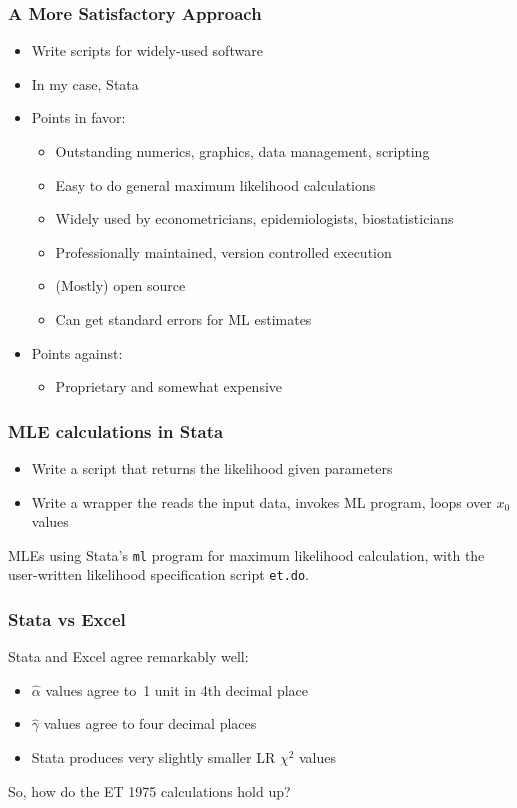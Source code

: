 \begin{frame}
    \frametitle{A More Satisfactory Approach}
	
	\begin{itemize}
		\item Write scripts for widely-used software
		\item In my case, Stata
		\item Points in favor:
		\begin{itemize}
			\item Outstanding numerics, graphics, data management, scripting
			\item Easy to do general maximum likelihood calculations
			\item Widely used by econometricians, epidemiologists, biostatisticians
			\item Professionally maintained, version controlled execution
			\item (Mostly) open source
			\item Can get standard errors for ML estimates
		\end{itemize}
		\item Points against:
		\begin{itemize}
			\item Proprietary and somewhat expensive
		\end{itemize}
	\end{itemize}
\end{frame}


\begin{frame}
	\frametitle{MLE calculations in Stata}
	\begin{itemize}
		\item Write a script that returns the likelihood given parameters
		\item Write a wrapper the reads the input data, invokes ML program, loops over $x_0$ values
	\end{itemize}
	\bigskip
	\begin{table}
		\centering
		
		\caption{MLEs using Stata's \texttt{ml} program for maximum likelihood calculation, with the user-written likelihood specification script \texttt{et.do}.}
	\end{table}
\end{frame}

\begin{frame}
	\frametitle{Stata vs Excel}
	\strut
	\bigskip
	
	Stata and Excel agree remarkably well:
	\begin{itemize}
		\item $\hat\alpha$ values agree to~1 unit in 4th decimal place
		\item $\hat\gamma$ values agree to four decimal places
		\item Stata produces very slightly smaller LR $\chi^2$ values
	\end{itemize}
	\bigskip
	
	So, how do the ET 1975 calculations hold up?
	\bigskip
	
\end{frame}

